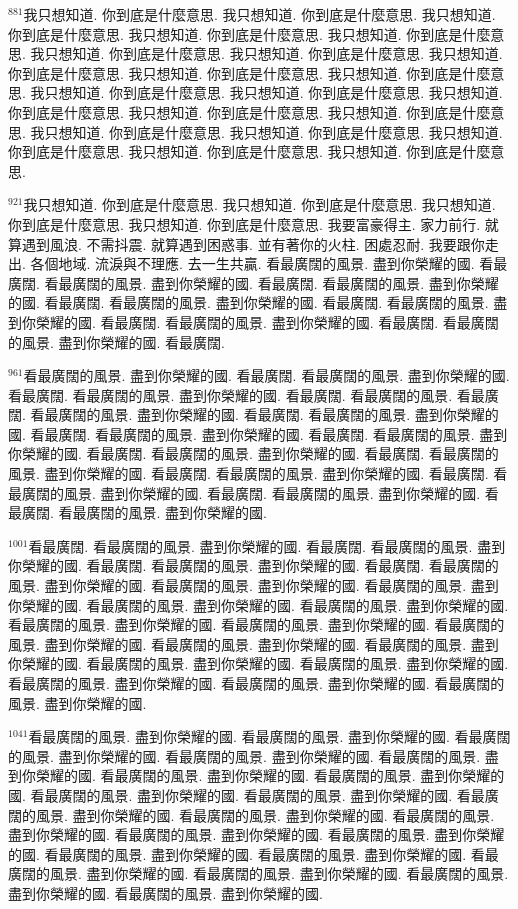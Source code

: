 \documentclass{book}
\begin{document}
$^{881}$我只想知道.
你到底是什麼意思.
我只想知道.
你到底是什麼意思.
我只想知道.
你到底是什麼意思.
我只想知道.
你到底是什麼意思.
我只想知道.
你到底是什麼意思.
我只想知道.
你到底是什麼意思.
我只想知道.
你到底是什麼意思.
我只想知道.
你到底是什麼意思.
我只想知道.
你到底是什麼意思.
我只想知道.
你到底是什麼意思.
我只想知道.
你到底是什麼意思.
我只想知道.
你到底是什麼意思.
我只想知道.
你到底是什麼意思.
我只想知道.
你到底是什麼意思.
我只想知道.
你到底是什麼意思.
我只想知道.
你到底是什麼意思.
我只想知道.
你到底是什麼意思.
我只想知道.
你到底是什麼意思.
我只想知道.
你到底是什麼意思.
我只想知道.
你到底是什麼意思.

$^{921}$我只想知道.
你到底是什麼意思.
我只想知道.
你到底是什麼意思.
我只想知道.
你到底是什麼意思.
我只想知道.
你到底是什麼意思.
我要富豪得主.
家力前行.
就算遇到風浪.
不需抖震.
就算遇到困惑事.
並有著你的火柱.
困處忍耐.
我要跟你走出.
各個地域.
流淚與不理應.
去一生共贏.
看最廣闊的風景.
盡到你榮耀的國.
看最廣闊.
看最廣闊的風景.
盡到你榮耀的國.
看最廣闊.
看最廣闊的風景.
盡到你榮耀的國.
看最廣闊.
看最廣闊的風景.
盡到你榮耀的國.
看最廣闊.
看最廣闊的風景.
盡到你榮耀的國.
看最廣闊.
看最廣闊的風景.
盡到你榮耀的國.
看最廣闊.
看最廣闊的風景.
盡到你榮耀的國.
看最廣闊.

$^{961}$看最廣闊的風景.
盡到你榮耀的國.
看最廣闊.
看最廣闊的風景.
盡到你榮耀的國.
看最廣闊.
看最廣闊的風景.
盡到你榮耀的國.
看最廣闊.
看最廣闊的風景.
看最廣闊.
看最廣闊的風景.
盡到你榮耀的國.
看最廣闊.
看最廣闊的風景.
盡到你榮耀的國.
看最廣闊.
看最廣闊的風景.
盡到你榮耀的國.
看最廣闊.
看最廣闊的風景.
盡到你榮耀的國.
看最廣闊.
看最廣闊的風景.
盡到你榮耀的國.
看最廣闊.
看最廣闊的風景.
盡到你榮耀的國.
看最廣闊.
看最廣闊的風景.
盡到你榮耀的國.
看最廣闊.
看最廣闊的風景.
盡到你榮耀的國.
看最廣闊.
看最廣闊的風景.
盡到你榮耀的國.
看最廣闊.
看最廣闊的風景.
盡到你榮耀的國.

$^{1001}$看最廣闊.
看最廣闊的風景.
盡到你榮耀的國.
看最廣闊.
看最廣闊的風景.
盡到你榮耀的國.
看最廣闊.
看最廣闊的風景.
盡到你榮耀的國.
看最廣闊.
看最廣闊的風景.
盡到你榮耀的國.
看最廣闊的風景.
盡到你榮耀的國.
看最廣闊的風景.
盡到你榮耀的國.
看最廣闊的風景.
盡到你榮耀的國.
看最廣闊的風景.
盡到你榮耀的國.
看最廣闊的風景.
盡到你榮耀的國.
看最廣闊的風景.
盡到你榮耀的國.
看最廣闊的風景.
盡到你榮耀的國.
看最廣闊的風景.
盡到你榮耀的國.
看最廣闊的風景.
盡到你榮耀的國.
看最廣闊的風景.
盡到你榮耀的國.
看最廣闊的風景.
盡到你榮耀的國.
看最廣闊的風景.
盡到你榮耀的國.
看最廣闊的風景.
盡到你榮耀的國.
看最廣闊的風景.
盡到你榮耀的國.

$^{1041}$看最廣闊的風景.
盡到你榮耀的國.
看最廣闊的風景.
盡到你榮耀的國.
看最廣闊的風景.
盡到你榮耀的國.
看最廣闊的風景.
盡到你榮耀的國.
看最廣闊的風景.
盡到你榮耀的國.
看最廣闊的風景.
盡到你榮耀的國.
看最廣闊的風景.
盡到你榮耀的國.
看最廣闊的風景.
盡到你榮耀的國.
看最廣闊的風景.
盡到你榮耀的國.
看最廣闊的風景.
盡到你榮耀的國.
看最廣闊的風景.
盡到你榮耀的國.
看最廣闊的風景.
盡到你榮耀的國.
看最廣闊的風景.
盡到你榮耀的國.
看最廣闊的風景.
盡到你榮耀的國.
看最廣闊的風景.
盡到你榮耀的國.
看最廣闊的風景.
盡到你榮耀的國.
看最廣闊的風景.
盡到你榮耀的國.
看最廣闊的風景.
盡到你榮耀的國.
看最廣闊的風景.
盡到你榮耀的國.
看最廣闊的風景.
盡到你榮耀的國.
\end{document}
